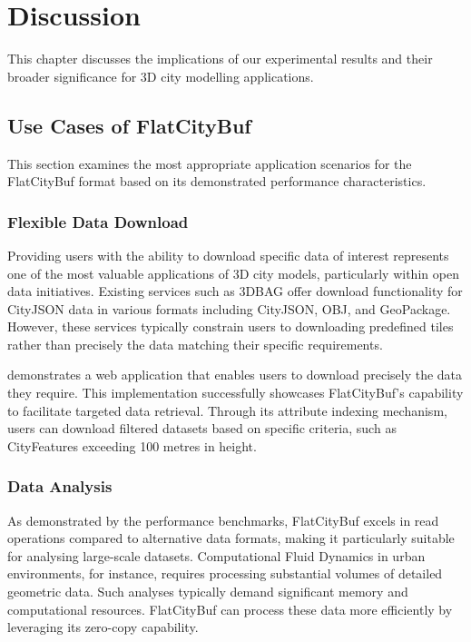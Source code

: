 \chapter{Discussion}
\label{chp:discussion}

This chapter discusses the implications of our experimental results and their broader significance for 3D city modelling applications.

\section{Use Cases of FlatCityBuf}
\label{use_case_flat_city_buffer}

This section examines the most appropriate application scenarios for the FlatCityBuf format based on its demonstrated performance characteristics.

\subsection{Flexible Data Download}
\label{flexible_data_download}

Providing users with the ability to download specific data of interest represents one of the most valuable applications of 3D city models, particularly within open data initiatives. Existing services such as 3DBAG offer download functionality for CityJSON data in various formats including CityJSON, OBJ, and GeoPackage. However, these services typically constrain users to downloading predefined tiles rather than precisely the data matching their specific requirements.

\citet{fcb-web-demo} demonstrates a web application that enables users to download precisely the data they require. This implementation successfully showcases FlatCityBuf's capability to facilitate targeted data retrieval. Through its attribute indexing mechanism, users can download filtered datasets based on specific criteria, such as CityFeatures exceeding 100 metres in height.

\subsection{Data Analysis}
\label{data_analysis}
As demonstrated by the performance benchmarks, FlatCityBuf excels in read operations compared to alternative data formats, making it particularly suitable for analysing large-scale datasets. Computational Fluid Dynamics in urban environments, for instance, requires processing substantial volumes of detailed geometric data. Such analyses typically demand significant memory and computational resources. FlatCityBuf can process these data more efficiently by leveraging its zero-copy capability.

